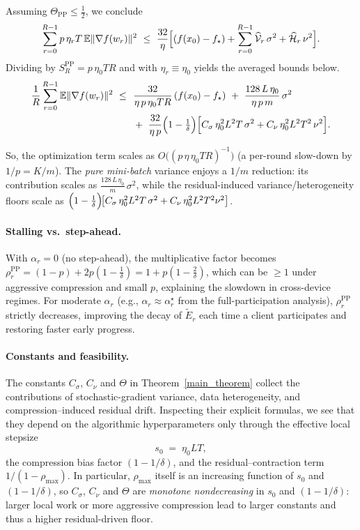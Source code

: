 \documentclass{article} %
\newcommand{\E}{\mathbb{E}}
\begin{document}
Assuming $\Theta_{\mathrm{PP}}\le\frac12$, we conclude
\[
\sum_{r=0}^{R-1}p\,\eta_rT\,\E\|\nabla f(w_r)\|^{2}
\ \le\ \frac{32}{\eta}\Bigl[(f(x_0)-f_\star)+\sum_{r=0}^{R-1}\widehat{\mathcal V}_r\,\sigma^{2}+\widehat{\mathcal H}_r\,\nu^{2}\Bigr].
\]
Dividing by $S_R^{\mathrm{PP}}=p\,\eta_0TR$ and with $\eta_r\equiv\eta_0$ yields the averaged bounds below.
\begin{align}
\frac{1}{R}\sum_{r=0}^{R-1}\E\|\nabla f(w_r)\|^{2}
~\le~&
~\frac{32}{\eta\,p\,\eta_0 T R}\,(f(x_0)-f_\star)
~+~ \frac{128\,L\,\eta_0}{\eta\,p\,m}\,\sigma^{2}
\nonumber\\
&~+~ \frac{32}{\eta\,p}\Bigl(1-\tfrac{1}{\delta}\Bigr)\Bigl[C_\sigma\,\eta_0^{2} L^{2} T\,\sigma^{2}+C_\nu\,\eta_0^{2} L^{2} T^{2}\,\nu^{2}\Bigr].
\label{eq:const-eta0-bound}
\end{align}

So, the optimization term scales as
$O\big((p\,\eta\,\eta_0TR)^{-1}\big)$ (a per-round slow-down by $1/p=K/m$).
The \emph{pure mini-batch} variance enjoys a $1/m$ reduction: its contribution scales as $\frac{128\,L\,\eta_0}{m}\,\sigma^{2}$,
while the residual-induced variance/heterogeneity floors scale as
$\Bigl(1-\tfrac1\delta\Bigr)\!\bigl[C_\sigma\,\eta_0^{2}L^{2}T\,\sigma^{2}
+ C_\nu\,\eta_0^{2}L^{2}T^{2}\nu^{2}\bigr]$.

\paragraph{Stalling vs.\ step-ahead.}
With $\alpha_r=0$ (no step-ahead), the multiplicative factor becomes
$\rho_r^{\mathrm{PP}}=(1-p)+2p(1-\tfrac1\delta)=1+p(1-\tfrac{2}{\delta})$, which can be
$\ge1$ under aggressive compression and small $p$, explaining the slowdown in cross-device regimes. For moderate $\alpha_r$ (e.g., $\alpha_r\approx\alpha_r^\star$ from the full-participation analysis), $\rho_r^{\mathrm{PP}}$ strictly decreases, improving the decay of $\tilde E_r$ each time a client participates and restoring faster early progress.

\paragraph{Constants and feasibility.}
The constants $C_\sigma$, $C_\nu$ and $\Theta$ in Theorem~\ref{main_theorem} collect the contributions of stochastic-gradient variance, data heterogeneity, and compression–induced residual drift. Inspecting their explicit formulas, we see that they depend on the algorithmic hyperparameters only through the effective local stepsize
\[
s_0 \;=\; \eta_0 L T,
\]
the compression bias factor $(1 - 1/\delta)$, and the residual–contraction term $1/(1-\rho_{\max})$. In particular, $\rho_{\max}$ itself is an increasing function of $s_0$ and $(1-1/\delta)$, so $C_\sigma$, $C_\nu$ and $\Theta$ are \emph{monotone nondecreasing} in $s_0$ and $(1-1/\delta)$: larger local work or more aggressive compression lead to larger constants and thus a higher residual-driven floor.
\end{document}
